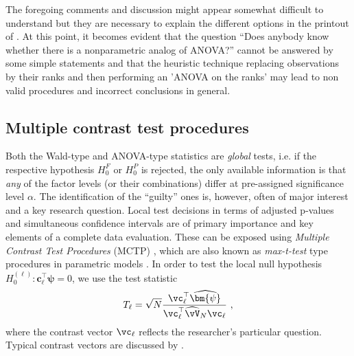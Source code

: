 The foregoing comments and discussion might appear somewhat difficult to 
understand but they are necessary to explain the different options in the 
printout of . At this point, it becomes evident that the question 
``Does anybody know whether there is a nonparametric analog of ANOVA?'' cannot 
be answered by some simple statements and that the heuristic technique 
replacing observations by their ranks and then performing an 'ANOVA on the 
ranks' may lead to non valid procedures and incorrect conclusions in general.

\subsection{Multiple contrast test procedures}\label{subsec:MTCP}
Both the Wald-type and ANOVA-type statistics are \textit{global} tests, i.e. if 
the respective hypothesis $H_0^F$ or $H_0^P$ is rejected, the only available 
information is that \textit{any} of the factor levels (or their combinations) 
differ at pre-assigned significance level $\alpha$. The identification of the 
``guilty'' ones is, however, often of major interest and a key research question. 
Local test decisions in terms of adjusted p-values and simultaneous confidence 
intervals are of primary importance and key elements of a complete data 
evaluation. These can be exposed using \textit{Multiple Contrast Test 
Procedures} (MCTP) \citep{bretz2001numerical, hothorn2008simultaneous, 
konietschke2012rank}, which are also known as \textit{max-t-test} type 
procedures in parametric models \citep{konietschke2020small}. In order to test 
the local null hypothesis $H_0^{(\ell)}: \mathbf{c}_\ell^\top\bm{\psi} = 0$, we 
use the test statistic
\begin{eqnarray}
T_{\ell} = \sqrt{N} \frac{\vc_\ell^\top\widehat{\bm{\psi}}}{\vc_\ell^\top 
\widehat{\vV}_N \vc_\ell} \ , \label{tellmcp}
\end{eqnarray}
where the contrast vector $\vc_\ell$ reflects the researcher's particular 
question. Typical contrast vectors are discussed by \cite{bretz2001numerical}.


